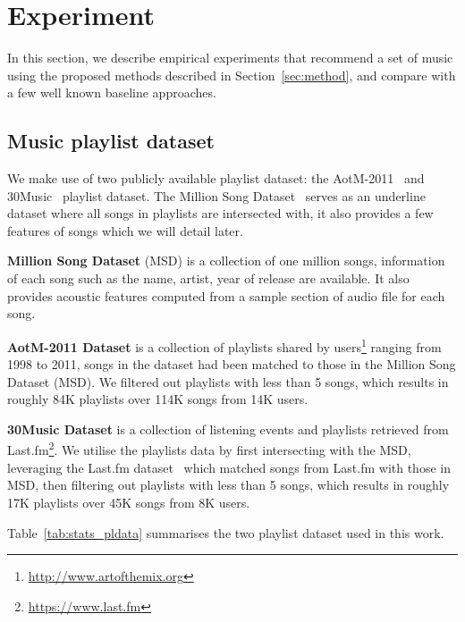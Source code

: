 \section{Experiment}
\label{sec:experiment}

In this section, we describe empirical experiments that recommend a set of music using the proposed methods
described in Section~\ref{sec:method}, and compare with a few well known baseline approaches.

\subsection{Music playlist dataset}
We make use of two publicly available playlist dataset: the AotM-2011~\cite{mcfee2012hypergraph} and 30Music~\cite{30music2015} playlist dataset.
The Million Song Dataset~\cite{msd2011} serves as an underline dataset where all songs in playlists are intersected with,
it also provides a few features of songs which we will detail later.

{\bf Million Song Dataset} (MSD) is a collection of one million songs, information of each song such as the name, artist, year of release are available.
It also provides acoustic features computed from a sample section of audio file for each song. %

{\bf AotM-2011 Dataset} is a collection of playlists shared by users\footnote{\url{http://www.artofthemix.org}} ranging from 1998 to 2011, 
songs in the dataset had been matched to those in the Million Song Dataset (MSD).
We filtered out playlists with less than 5 songs, which results in roughly 84K playlists over 114K songs from 14K users.

{\bf 30Music Dataset} is a collection of listening events and playlists retrieved from Last.fm\footnote{\url{https://www.last.fm}}.
We utilise the playlists data by first intersecting with the MSD, leveraging the Last.fm dataset~\cite{lastfmdataset} 
which matched songs from Last.fm with those in MSD, then filtering out playlists with less than 5 songs, 
which results in roughly 17K playlists over 45K songs from 8K users.

Table~\ref{tab:stats_pldata} summarises the two playlist dataset used in this work.
%
\begin{table}[!h]
\centering
\caption{Statistics of music playlist dataset}
\label{tab:stats_pldata}
\end{table}


